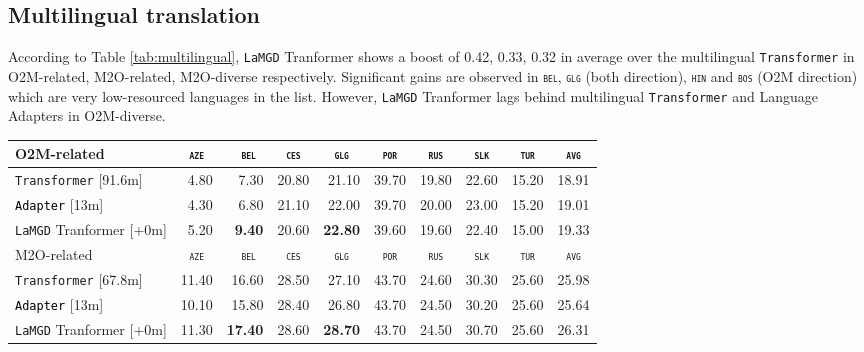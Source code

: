 \documentclass[11pt]{article}
\newcommand{\revision}[1]{\textcolor{black}{#1}}
\newcommand{\domain}[1]{\texttt{\textsc{#1}}}
\newcommand{\system}[1]{\texttt{{#1}}}
\newcommand{\SB}[1]{\textbf{#1}}
\begin{document}
\subsection{Multilingual translation}
According to Table \ref{tab:multilingual}, \system{LaMGD} Tranformer shows a boost of 0.42, 0.33, 0.32 in average over the multilingual \system{Transformer} in O2M-related, M2O-related, M2O-diverse respectively. Significant gains are observed in \domain{bel}, \domain{glg} (both direction), \domain{hin} and \domain{bos} (O2M direction) which are very low-resourced languages in the list. However, \system{LaMGD} Tranformer lags behind multilingual \system{Transformer} and Language Adapters in O2M-diverse. 
\begin{table}[h!]
  \centering
  \begin{tabular}{|p{4cm}|*{9}{r|}} \hline
    O2M-related & \multicolumn{1}{c|}{\domain{aze}} & \multicolumn{1}{c|}{\domain{ bel}} & \multicolumn{1}{c|}{\domain{ces}} & \multicolumn{1}{c|}{\domain{glg}} & \multicolumn{1}{c|}{\domain{por}} & \multicolumn{1}{c|}{\domain{rus}} & \multicolumn{1}{c|}{\domain{slk}} & \multicolumn{1}{c|}{\domain{tur}} & \multicolumn{1}{c|}{\domain{avg}} \\ \hline 
    \system{Transformer}  \hfill{\footnotesize[91.6m]} & 4.80 &7.30&20.80&21.10&39.70&19.80&22.60&15.20&18.91 \\
    \revision{\system{Adapter}}   \hfill{\footnotesize[13m]} &4.30&6.80&21.10&22.00&39.70&20.00&23.00&15.20&19.01 \\ 
    \system{LaMGD} Tranformer  \hfill{\footnotesize[+0m]}  & 5.20&\SB{9.40}&20.60&\SB{22.80}&39.60&19.60&22.40&15.00&19.33 \\ 
	\hline
    \hline
    M2O-related & \multicolumn{1}{c|}{\domain{aze}} & \multicolumn{1}{c|}{\domain{ bel}} & \multicolumn{1}{c|}{\domain{ces}} & \multicolumn{1}{c|}{\domain{glg}} & \multicolumn{1}{c|}{\domain{por}} & \multicolumn{1}{c|}{\domain{rus}} & \multicolumn{1}{c|}{\domain{slk}} & \multicolumn{1}{c|}{\domain{tur}} & \multicolumn{1}{c|}{\domain{avg}} \\ \hline 
    \system{Transformer}  \hfill{\footnotesize[67.8m]} &11.40&16.60&28.50&	27.10&43.70&24.60&30.30&25.60&25.98 \\
    \revision{\system{Adapter}}   \hfill{\footnotesize[13m]} &10.10&15.80&28.40&26.80&43.70&24.50&30.20&25.60&25.64\\ 
    \system{LaMGD} Tranformer   \hfill{\footnotesize[+0m]}  &11.30&\SB{17.40}&28.60&\SB{28.70}&43.70&24.50&30.70&25.60&26.31 \\ 

\end{tabular}
\end{table}
\end{document}
